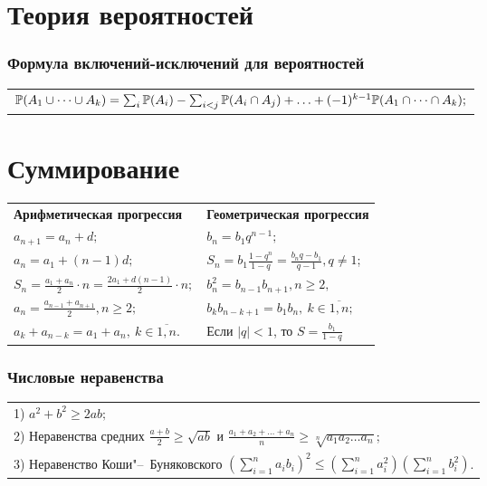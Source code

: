 \section{Теория вероятностей}

\subsubsection{Формула включений-исключений для вероятностей}

\begin{longtable}[l]{l}
	$\mathbb{P}(A_1\cup\dots\cup A_k)= \sum_{i} \mathbb{P}(A_i) - \sum_{i<j} \mathbb{P}(A_i\cap A_j)+\ldots + (-1)^{k-1}\mathbb{P}(A_1\cap\dots\cap A_k);$
\end{longtable}

\section{Суммирование}
\begin{longtable}[l]{l l}
{\normalfont\normalsize\sffamily\bfseries Арифметическая прогрессия}
&
{\normalfont\normalsize\sffamily\bfseries Геометрическая прогрессия}
\\
$a_{n+1}=a_n+d;$ & $b_n=b_1 q^{n-1};$
\\
$a_n=a_1+(n-1)d;$ & $S_n=b_1\frac{1-q^n}{1-q}=\frac{b_n q-b_1}{q-1}, q\ne 1$;
\\ 
$S_n=\frac{a_1+a_n}{2}\cdot n=\frac{2a_1+d(n-1)}{2}\cdot n;$ & $b^2_n=b_{n-1}b_{n+1}, n\geq2,$
\\
$a_n=\frac{a_{n-1}+a_{n+1}}{2}, n\geq 2;$ & $b_kb_{n-k+1}=b_1b_n,\ k\in\overline{1,n};$
\\
$a_k+a_{n-k}=a_1+a_n,\ k\in\overline{1,n}.$ & Если $|q|<1$, то $S=\frac{b_1}{1-q}$
\end{longtable}

\subsubsection{Числовые неравенства}

\begin{longtable}[l]{l}
	1) $a^2+b^2 \ge 2ab;$ \\
	2) Неравенства средних $\frac{a+b}{2} \ge \sqrt{ab}$ и $\frac{a_1+a_2+\ldots+a_n}{n} \ge \sqrt[n]{a_1 a_2\ldots a_n}$; \\
	3) Неравенство Коши"--~Буняковского $\left(\sum_{i=1}^n a_i b_i\right)^2 \le \left(\sum_{i=1}^n a_i^2\right) \left(\sum_{i=1}^n b_i^2\right)$.
\end{longtable}

